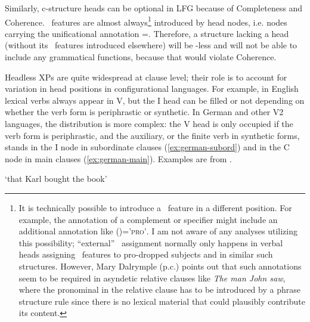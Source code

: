 \documentclass[output=paper,hidelinks]{langscibook}
\begin{document}
  Similarly, c-structure heads can be optional in LFG because of Completeness and Coherence. \PRED\ features are almost always\footnote{It is technically possible to introduce a \PRED\ feature in a different position. For example, the annotation of a complement or specifier might include an additional annotation like (\UP\OBJ\PRED)=\textsc{'pro'}. I am not aware of any analyses utilizing this possibility; ``external'' \PRED\ assignment normally only happens in verbal heads assigning \PRED\ features to pro-dropped subjects and in similar such structures. However, Mary Dalrymple (p.c.) points out that such annotations seem to be required in asyndetic relative clauses like \textit{The man John saw}, where the pronominal \OBJ in the relative clause has to be introduced by a phrase structure rule since there is no lexical material that could plausibly contribute its content.} introduced by head nodes, i.e. nodes carrying the unificational annotation \UP=\DOWN. Therefore, a structure lacking a head (without its \PRED\ features introduced elsewhere) will be \PRED-less and will not be able to include any grammatical functions, because that would violate Coherence.
 
 Headless XPs are quite widespread at clause level; their role is to account for variation in head positions in configurational languages. For example, in English lexical verbs always appear in V, but the I head can be filled or not depending on whether the verb form is periphrastic or synthetic. In German and other V2 languages, the distribution is more complex: the V head is only occupied if the verb form is periphrastic, and the auxiliary, or the finite verb in synthetic forms, stands in the I node in subordinate clauses (\ref{ex:german-subord}) and in the C node in main clauses (\ref{ex:german-main}). Examples are from \textcite[448--450]{BresnanEtAl2016}.
 
 \newpage
 \ea{}
  \sn `that Karl bought the book'
  \z
  
\end{document}
